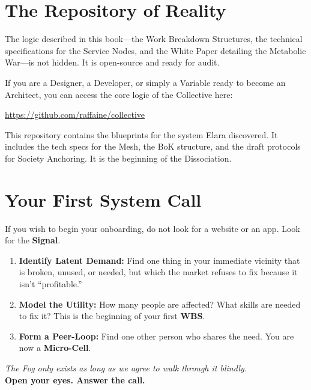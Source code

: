 \section*{The Repository of Reality}
The logic described in this book—the Work Breakdown Structures, the technical specifications for the Service Nodes, and the White Paper detailing the Metabolic War—is not hidden. It is open-source and ready for audit.

If you are a Designer, a Developer, or simply a Variable ready to become an Architect, you can access the core logic of the Collective here:

\begin{center}
    \headerfont\color{collectiveBlue} \url{https://github.com/raffaine/collective}
\end{center}

This repository contains the blueprints for the system Elara discovered. It includes the tech specs for the Mesh, the BoK structure, and the draft protocols for Society Anchoring. It is the beginning of the Dissociation.

\section*{Your First System Call}
If you wish to begin your onboarding, do not look for a website or an app. Look for the \textbf{Signal}.
\begin{enumerate}
    \item \textbf{Identify Latent Demand:} Find one thing in your immediate vicinity that is broken, unused, or needed, but which the market refuses to fix because it isn't ``profitable.''
    \item \textbf{Model the Utility:} How many people are affected? What skills are needed to fix it? This is the beginning of your first \textbf{WBS}.
    \item \textbf{Form a Peer-Loop:} Find one other person who shares the need. You are now a \textbf{Micro-Cell}.
\end{enumerate}

\begin{center}
    \textit{The Fog only exists as long as we agree to walk through it blindly.} \\
    \textbf{Open your eyes. Answer the call.}
\end{center}
